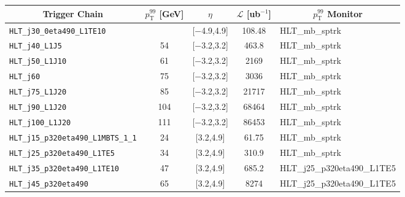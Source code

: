 \documentclass[NOTE, atlasdraft=true, texlive=2020, UKenglish]{atlasdoc}
\newcommand{\PTE}{p_{\text{T}}}
\newcommand{\TN}[1]{ \text{#1} }
\begin{document}
\begin{table}[!ht]
\centering
\begin{tabular}{ | c | c | c | c | c |}
           \hline
           \textbf{Trigger Chain} &  \textbf{$\PTE^{99}$ [GeV]} & \textbf{$\eta$} & \textbf{$\mathscr{L}$ [ub$^{-1}$]} &\textbf{$p_{\TN{T}}^{99}$ Monitor}\\
            \hline
            \multicolumn{1}{|l|}{\texttt{HLT\_j30\_0eta490\_L1TE10}}   & \color{black}{40}  & [$-$4.9,4.9]   & 108.48 &  \multicolumn{1}{l|}{\scriptsize HLT\_mb\_sptrk} \\
            \hline
            \multicolumn{1}{|l|}{\texttt{HLT\_j40\_L1J5}}    & 54     & [$-$3.2,3.2]   & 463.8 &  \multicolumn{1}{l|}{\scriptsize HLT\_mb\_sptrk}\\
            \hline
            \multicolumn{1}{|l|}{\texttt{HLT\_j50\_L1J10}}    & 61    & [$-$3.2,3.2]   & 2169 &  \multicolumn{1}{l|}{\scriptsize HLT\_mb\_sptrk}\\
            \hline
            \multicolumn{1}{|l|}{\texttt{HLT\_j60}} & 75        & [$-$3.2,3.2]   & 3036 &  \multicolumn{1}{l|}{\scriptsize HLT\_mb\_sptrk}\\
            \hline
            \multicolumn{1}{|l|}{\texttt{HLT\_j75\_L1J20}}   & 85  & [$-$3.2,3.2]   & 21717 &  \multicolumn{1}{l|}{\scriptsize HLT\_mb\_sptrk}\\
            \hline
            \multicolumn{1}{|l|}{\texttt{HLT\_j90\_L1J20}}   & 104  & [$-$3.2,3.2]   & 68464 &  \multicolumn{1}{l|}{\scriptsize HLT\_mb\_sptrk}\\
            \hline
            \multicolumn{1}{|l|}{\texttt{HLT\_j100\_L1J20}}   & 111 & [$-$3.2,3.2]   & 86453 &  \multicolumn{1}{l|}{\scriptsize HLT\_mb\_sptrk}\\
            \hline
            \multicolumn{1}{|l|}{\texttt{HLT\_j15\_p320eta490\_L1MBTS\_1\_1}}   & 24  & [3.2,4.9]   & 61.75 &  \multicolumn{1}{l|}{\scriptsize HLT\_mb\_sptrk}\\
            \hline
            \multicolumn{1}{|l|}{\texttt{HLT\_j25\_p320eta490\_L1TE5}}   & 34  & [3.2,4.9]   & 310.9 &  \multicolumn{1}{l|}{\scriptsize HLT\_mb\_sptrk}\\
            \hline
            \multicolumn{1}{|l|}{\texttt{HLT\_j35\_p320eta490\_L1TE10}}   & 47  & [3.2,4.9]   & 685.2 &  \multicolumn{1}{l|}{\scriptsize HLT\_j25\_p320eta490\_L1TE5}\\
            \hline
            \multicolumn{1}{|l|}{\texttt{HLT\_j45\_p320eta490}}   & 65  & [3.2,4.9]   & 8274 &  \multicolumn{1}{l|}{\scriptsize HLT\_j25\_p320eta490\_L1TE5}\\

\end{tabular}
\end{table}
\end{document}
